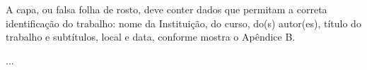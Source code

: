 \begin{Desenvolvimento}
A capa, ou falsa folha de rosto, deve conter dados que permitam a correta identificação do trabalho: nome da Instituição, do curso, do(s) autor(es), título do trabalho e subtítulos, local e data, conforme mostra o Apêndice B.

\end{Desenvolvimento}






\begin{Conclusao} %
...

\end{Conclusao}